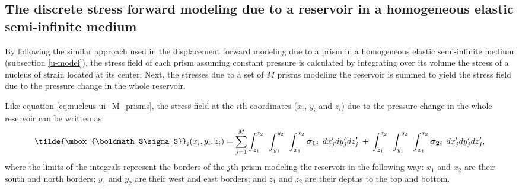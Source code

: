 \documentclass[journal abbreviation, manuscript]{copernicus}
\begin{document}
\subsection{The discrete stress forward modeling due to a reservoir in a homogeneous elastic semi-infinite medium}

By following the similar approach used in the displacement forward modeling due to a prism in a homogeneous elastic semi-infinite medium (subsection \ref{u-model}), the stress field of each prism assuming constant pressure is calculated by integrating over its volume the stress of a nucleus of strain located at its center. 
Next, the stresses due to a set of $M$ prisms modeling the reservoir is summed to yield the stress field  due to the pressure change in the whole reservoir.

Like equation \ref{eq:nucleus-ui_M_prisms}, the stress field at the $i$th coordinates ($x_i$, $y_i$  and $z_i$) due to the pressure change in the whole reservoir can be written as:
\begin{equation}
\tilde{\mbox{\boldmath$\sigma$}}_{i}(x_i,y_i,z_i)
= \sum_{j=1}^{M} 
\int_{z_1}^{z_2} \:\:
\int_{y_1}^{y_2} \:\: 
\int_{x_1}^{x_2} 
\mbox{\boldmath$\sigma_{1}$}_{i}\: \:  dx^{\prime}_j dy^{\prime}_j dz^{\prime}_j 
\: + \: 
\int_{z_1}^{z_2} \:\:
\int_{y_1}^{y_2} \:\: 
\int_{x_1}^{x_2} 
\mbox{\boldmath$\sigma_{2}$}_{i} \:\:  dx^{\prime}_j dy^{\prime}_j dz^{\prime}_j, 
\label{eq:nucleus-stress_M_prisms}
\end{equation}
where the limits of the integrals represent the borders of the $j$th prism modeling the reservoir in the following way: $x_1$ and $x_2$ are their south and north borders; $y_1$ and  $y_2$ are their  west and east borders;  and $z_1$ and $z_2$ are their depths to the top and bottom.
\end{document}
